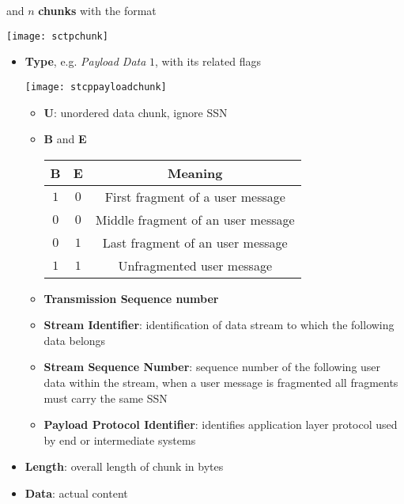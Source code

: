 \newpage
and $n$ \textbf{chunks} with the format
\begin{center}
	\texttt{[image: sctpchunk]}
\end{center}
\begin{itemize}
	\item \textbf{Type}, e.g. \textit{Payload Data} $1$, with its related flags
	\begin{center}
		\texttt{[image: stcppayloadchunk]}
	\end{center}
	\begin{itemize}
		\item \textbf{U}: unordered data chunk, ignore SSN
		\item \textbf{B} and \textbf{E}
		\begin{table}[!h]
			\centering
			\begin{tabular}{c|c|c}
				\textbf{B} & \textbf{E} & \textbf{Meaning} \\
				\hline
				$1$ & $0$ & First fragment of a user message \\
				\hline
				$0$ & $0$ & Middle fragment of an user message \\
				\hline
				$0$ & $1$ & Last fragment of an user message \\
				\hline
				$1$ & $1$ & Unfragmented user message
			\end{tabular}
		\end{table}
		\item \textbf{Transmission Sequence number}
		\item \textbf{Stream Identifier}: identification of data stream to which the following data belongs
		\item \textbf{Stream Sequence Number}: sequence number of the following user data within the stream, when a user message is fragmented all fragments must carry the same SSN
		\item \textbf{Payload Protocol Identifier}: identifies application layer protocol used by end or intermediate systems
	\end{itemize}
	\item \textbf{Length}: overall length of chunk in bytes
	\item \textbf{Data}: actual content
\end{itemize}